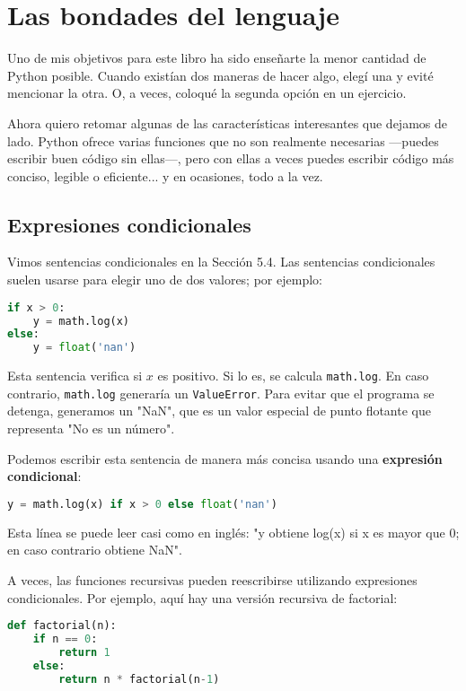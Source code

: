 \chapter{Las bondades del lenguaje}

Uno de mis objetivos para este libro ha sido enseñarte la menor cantidad de Python posible. Cuando existían dos maneras de hacer algo, elegí una y evité mencionar la otra. O, a veces, coloqué la segunda opción en un ejercicio.

Ahora quiero retomar algunas de las características interesantes que dejamos de lado. Python ofrece varias funciones que no son realmente necesarias —puedes escribir buen código sin ellas—, pero con ellas a veces puedes escribir código más conciso, legible o eficiente... y en ocasiones, todo a la vez.

\section{Expresiones condicionales}

Vimos sentencias condicionales en la Sección 5.4. Las sentencias condicionales suelen usarse para elegir uno de dos valores; por ejemplo:

\begin{lstlisting}[language=Python]
if x > 0:
    y = math.log(x)
else:
    y = float('nan')
\end{lstlisting}

Esta sentencia verifica si \(x\) es positivo. Si lo es, se calcula \texttt{math.log}. En caso contrario, \texttt{math.log} generaría un \texttt{ValueError}. Para evitar que el programa se detenga, generamos un "NaN", que es un valor especial de punto flotante que representa "No es un número".

Podemos escribir esta sentencia de manera más concisa usando una \textbf{expresión condicional}:

\begin{lstlisting}[language=Python]
y = math.log(x) if x > 0 else float('nan')
\end{lstlisting}

Esta línea se puede leer casi como en inglés: "y obtiene log(x) si x es mayor que 0; en caso contrario obtiene NaN".

A veces, las funciones recursivas pueden reescribirse utilizando expresiones condicionales. Por ejemplo, aquí hay una versión recursiva de factorial:

\begin{lstlisting}[language=Python]
def factorial(n):
    if n == 0:
        return 1
    else:
        return n * factorial(n-1)
\end{lstlisting}

